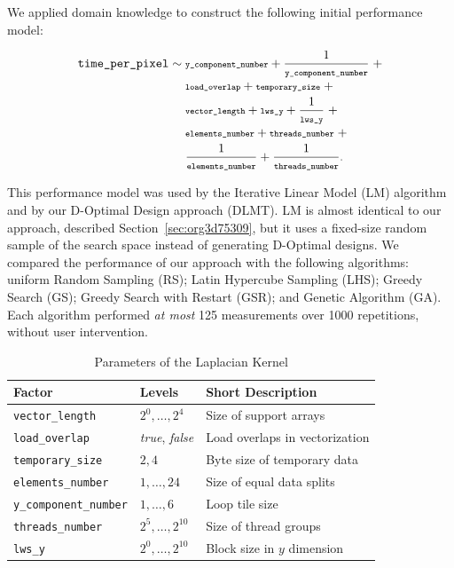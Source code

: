 \documentclass[conference]{IEEEtran}
\begin{document}
We applied domain knowledge to construct the following initial performance model:
\vspace{-2pt}
\\\begin{minipage}{\linewidth}\scriptsize
\begin{align}
\label{eq:gpu_laplacian_performance_model}
\texttt{time\_per\_pixel} \sim & \scriptsize\; \texttt{y\_component\_number} + \frac{1}{\texttt{y\_component\_number}} \; + \nonumber \\
& \scriptsize\; \texttt{load\_overlap} + \texttt{temporary\_size} \; + \nonumber \\
& \scriptsize\; \texttt{vector\_length} + \texttt{lws\_y} + \frac{1}{\texttt{lws\_y}} \; + \\
& \scriptsize\; \texttt{elements\_number} + \texttt{threads\_number}  \; + \nonumber \\
& \scriptsize\; \frac{1}{\texttt{elements\_number}} + \frac{1}{\texttt{threads\_number}}\text{.} \nonumber
\end{align}
\vspace{2pt}
\end{minipage}
This performance model was used by the Iterative Linear Model (LM) algorithm and
by our D-Optimal Design approach (DLMT). LM is almost identical to our approach,
described Section~\ref{sec:org3d75309}, but it uses a
fixed-size random sample of the search space instead of generating D-Optimal
designs. We compared the performance of our approach with the following
algorithms: uniform Random Sampling (RS); Latin Hypercube Sampling (LHS); Greedy
Search (GS); Greedy Search with Restart (GSR); and Genetic Algorithm (GA). Each
algorithm performed \emph{at most} 125 measurements over 1000 repetitions, without
user intervention.

\begin{table}[t]
\caption{\label{tab:orge057e95}
Parameters of the Laplacian Kernel}
\centering
\scriptsize
\begin{tabular}{llp{}}
\toprule
Factor & Levels & Short Description\\
\midrule
\texttt{vector\_length} & \(2^0,\dots,2^4\) & Size of support arrays\\
\texttt{load\_overlap} & \textit{true}, \textit{false} & Load overlaps in vectorization\\
\texttt{temporary\_size} & \(2,4\) & Byte size of temporary data\\
\texttt{elements\_number} & \(1,\dots,24\) & Size of equal data splits\\
\texttt{y\_component\_number} & \(1,\dots,6\) & Loop tile size\\
\texttt{threads\_number} & \(2^5,\dots,2^{10}\) & Size of thread groups\\
\texttt{lws\_y} & \(2^0,\dots,2^{10}\) & Block size in \(y\) dimension\\
\bottomrule
\end{tabular}
\end{table}
\end{document}
